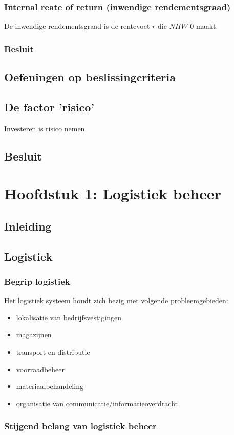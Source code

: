 \documentclass[12pt]{article}
\begin{document}
\subsubsection{Internal reate of return (inwendige rendementsgraad)}
De inwendige rendementsgraad is de rentevoet $r$ die $NHW$ 0 maakt.
\subsubsection{Besluit}
\subsection{Oefeningen op beslissingcriteria}
\subsection{De factor 'risico'}
Investeren is risico nemen.
\subsection{Besluit}
\clearpage
\section{Hoofdstuk 1: Logistiek beheer}
\subsection{Inleiding}
\subsection{Logistiek}
\subsubsection{Begrip logistiek}
Het logistiek systeem houdt zich bezig met volgende probleemgebieden:
\begin{itemize}
\item lokalisatie van bedrijfsvestigingen
\item magazijnen
\item transport en distributie
\item voorraadbeheer
\item materiaalbehandeling
\item organisatie van communicatie/informatieoverdracht
\end{itemize}
\subsubsection{Stijgend belang van logistiek beheer}
\end{document}
